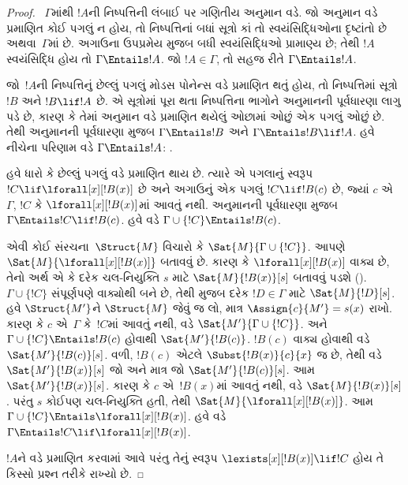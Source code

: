 \begin{proof}
~$\Gamma$માંથી $!A$ની નિષ્પત્તિની લંબાઈ પર ગણિતીય અનુમાન વડે.
જો અનુમાન વડે પ્રમાણિત કોઈ પગલું ન હોય, તો નિષ્પત્તિનાં બધાં
સૂત્રો કાં તો સ્વયંસિદ્ધિઓના દૃષ્ટાંતો છે અથવા~$\Gamma$માં છે.
અગાઉના ઉપપ્રમેય મુજબ બધી સ્વયંસિદ્ધિઓ
પ્રામાણ્ય છે; તેથી $!A$ સ્વયંસિદ્ધિ હોય તો
$\Gamma \Entails !A$. જો $!A \in \Gamma$, તો સહજ રીતે
$\Gamma \Entails !A$.

જો~$!A$ની નિષ્પત્તિનું છેલ્લું પગલું મોડસ પોનેન્સ વડે પ્રમાણિત
થતું હોય, તો નિષ્પત્તિમાં સૂત્રો $!B$ અને $!B \lif !A$ છે.
એ સૂત્રોમાં પૂરા થતા નિષ્પત્તિના ભાગોને અનુમાનની પૂર્વધારણા
લાગુ પડે છે, કારણ કે તેમાં અનુમાન વડે પ્રમાણિત થયેલું ઓછામાં ઓછું એક
પગલું ઓછું છે. તેથી અનુમાનની પૂર્વધારણા મુજબ
$\Gamma \Entails !B$ અને $\Gamma \Entails !B \lif !A$. હવે નીચેના
પરિણામ વડે $\Gamma \Entails !A$:
.

હવે ધારો કે છેલ્લું પગલું \QR{} વડે પ્રમાણિત થાય છે.
ત્યારે એ પગલાનું સ્વરૂપ $!C \lif \lforall[x][!B(x)]$ છે અને અગાઉનું
એક પગલું $!C \lif !B(c)$ છે, જ્યાં $c$ એ~$\Gamma$, $!C$ કે
$\lforall[x][!B(x)]$માં આવતું નથી. અનુમાનની પૂર્વધારણા મુજબ
$\Gamma \Entails !C \lif !B(c)$. હવે
 વડે
$\Gamma \cup \{!C\} \Entails !B(c)$.

એવી કોઈ સંરચના~$\Struct{M}$ વિચારો કે
$\Sat{M}{\Gamma \cup \{!C\}}$. આપણે
$\Sat{M}{\lforall[x][!B(x)]}$ બતાવવું છે. કારણ કે
$\lforall[x][!B(x)]$ વાક્ય છે, તેનો અર્થ એ કે દરેક ચલ-નિયુક્તિ
$s$ માટે $\Sat{M}{!B(x)}[s]$ બતાવવું પડશે
(). $\Gamma \cup \{!C\}$ સંપૂર્ણપણે
વાક્યોથી બને છે, તેથી  મુજબ દરેક
$!D \in \Gamma$ માટે $\Sat{M}{!D}[s]$. હવે $\Struct{M'}$ને
$\Struct{M}$ જેવું જ લો, માત્ર $\Assign{c}{M'} = s(x)$ રાખો. કારણ કે
$c$ એ~$\Gamma$ કે~$!C$માં આવતું નથી,
 વડે
$\Sat{M'}{\Gamma \cup \{!C\}}$. અને
$\Gamma \cup \{!C\} \Entails !B(c)$ હોવાથી $\Sat{M'}{!B(c)}$.
$!B(c)$ વાક્ય હોવાથી
 વડે
$\Sat{M'}{!B(c)}[s]$. વળી, $!B(c)$ એટલે
$\Subst{!B(x)}{c}{x}$ જ છે, તેથી
 વડે $\Sat{M'}{!B(x)}[s]$ જો અને
માત્ર જો $\Sat{M'}{!B(c)}[s]$. આમ $\Sat{M'}{!B(x)}[s]$. કારણ કે $c$
એ~$!B(x)$માં આવતું નથી,  વડે
$\Sat{M}{!B(x)}[s]$. પરંતુ $s$ કોઈપણ ચલ-નિયુક્તિ હતી, તેથી
$\Sat{M}{\lforall[x][!B(x)]}$. આમ
$\Gamma \cup \{!C\} \Entails \lforall[x][!B(x)]$. હવે
 વડે
$\Gamma \Entails !C \lif \lforall[x][!B(x)]$.

$!A$ને \QR{} વડે પ્રમાણિત કરવામાં આવે પરંતુ તેનું સ્વરૂપ
$\lexists[x][!B(x)] \lif !C$ હોય તે કિસ્સો પ્રશ્ન તરીકે રાખ્યો છે.
\end{proof}

